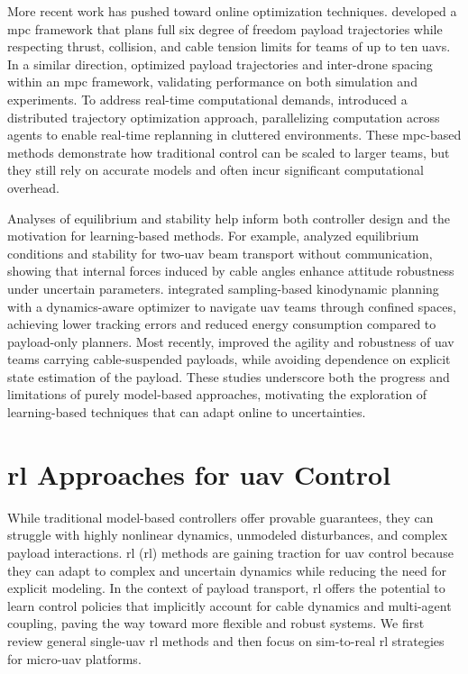 More recent work has pushed toward online optimization techniques. \cite{sun_nonlinear_2023} developed a \gls{mpc} framework that plans full six degree of freedom payload trajectories while respecting thrust, collision, and cable tension limits for teams of up to ten \glspl{uav}. In a similar direction, \cite{li_nonlinear_2023} optimized payload trajectories and inter-drone spacing within an \gls{mpc} framework, validating performance on both simulation and experiments. To address real-time computational demands, \cite{jackson_scalable_2020} introduced a distributed trajectory optimization approach, parallelizing computation across agents to enable real-time replanning in cluttered environments. These \gls{mpc}-based methods demonstrate how traditional control can be scaled to larger teams, but they still rely on accurate models and often incur significant computational overhead.

Analyses of equilibrium and stability help inform both controller design and the motivation for learning-based methods. For example, \cite{gabellieri_equilibria_2023} analyzed equilibrium conditions and stability for two-\gls{uav} beam transport without communication, showing that internal forces induced by cable angles enhance attitude robustness under uncertain parameters. \cite{wahba_kinodynamic_2024} integrated sampling-based kinodynamic planning with a dynamics-aware optimizer to navigate \gls{uav} teams through confined spaces, achieving lower tracking errors and reduced energy consumption compared to payload-only planners. Most recently, \cite{Wang2025SafeAA} improved the agility and robustness of \gls{uav} teams carrying cable-suspended payloads, while avoiding dependence on explicit state estimation of the payload. These studies underscore both the progress and limitations of purely model-based approaches, motivating the exploration of learning-based techniques that can adapt online to uncertainties.

\section{\gls{rl} Approaches for \gls{uav} Control}
While traditional model-based controllers offer provable guarantees, they can struggle with highly nonlinear dynamics, unmodeled disturbances, and complex payload interactions. \gls{rl} (\gls{rl}) methods are gaining traction for \gls{uav} control because they can adapt to complex and uncertain dynamics while reducing the need for explicit modeling. In the context of payload transport, \gls{rl} offers the potential to learn control policies that implicitly account for cable dynamics and multi-agent coupling, paving the way toward more flexible and robust systems. We first review general single-\gls{uav} \gls{rl} methods and then focus on sim-to-real \gls{rl} strategies for micro-\gls{uav} platforms.

